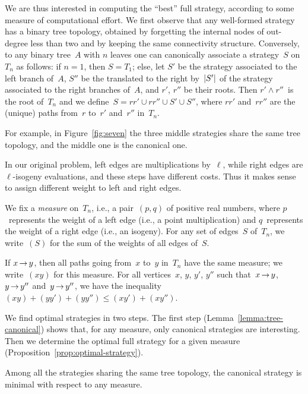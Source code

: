We are thus interested in computing the ``best'' full strategy,
according to some measure of computational effort. We first observe
that any well-formed strategy has a binary tree topology, obtained by
forgetting the internal nodes of out-degree less than two and by
keeping the same connectivity structure. Conversely, to any binary
tree~$A$ with $n$ leaves one can canonically associate a strategy~$S$
on $T_n$ as follows: if $n = 1$, then $S = T_1$; else, let $S'$ be the
strategy associated to the left branch of~$A$, $S''$ be the translated
to the right by~$\left|S'\right|$ of the strategy associated to the right
branches of~$A$, and $r'$, $r''$ be their roots. Then $r' \wedge
r''$~is the root of~$T_n$ and we define~$S = rr' \cup rr'' \cup S'
\cup S''$, where $rr'$ and~$rr''$ are the (unique) paths from~$r$
to~$r'$ and~$r''$ in~$T_n$.

For example, in Figure~\ref{fig:seven} the three middle
strategies share the same tree topology, and the middle one is the
canonical one.

In our original problem, left edges are multiplications by~$\ell$, while
right edges are $\ell$-isogeny evaluations, and these steps have
different costs. Thus it makes sense to assign different weight to left
and right edges.

We fix a \emph{measure} on~$T_n$, i.e., a pair~$(p,q)$ of
positive real numbers, where $p$~represents the weight of a left edge
(i.e., a point multiplication) and $q$~represents the weight of a
right edge (i.e., an isogeny). For any set of edges~$S$ of~$T_n$,
we write~$(S)$ for the sum of the weights of all edges of~$S$.

If $x \mathop{\rightarrow} y$, then all paths going from~$x$ to~$y$ in~$T_n$ have
the same measure; we write~$(xy)$ for this measure. For all vertices~$x$,
$y$, $y'$, $y''$ such that~$x \mathop{\rightarrow} y$, $y \mathop{\rightarrow} y''$ and~$y \mathop{\rightarrow}
y''$, we have the inequality $(xy) + (yy') + (yy'') \leq
(xy') + (xy'')$.

We find optimal strategies in two steps. The first step
(Lemma~\ref{lemma:tree-canonical}) shows that, for any measure, only
canonical strategies are interesting. Then we determine the optimal
full strategy for a given measure
(Proposition~\ref{prop:optimal-strategy}).

\begin{lemma}\label{lemma:tree-canonical}
  Among all the strategies sharing the same tree topology, the
  canonical strategy is minimal with respect to any measure.

\end{lemma}

